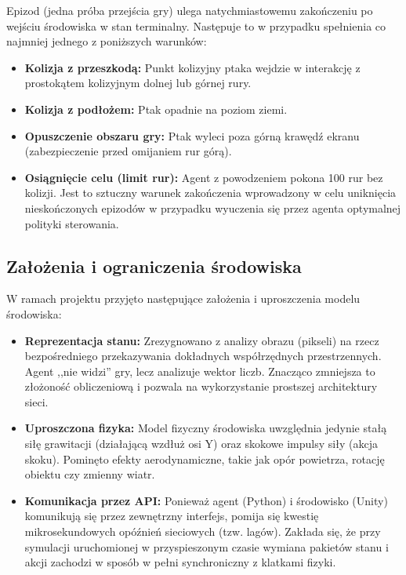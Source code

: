 \documentclass[12pt]{article}
\begin{document}
Epizod (jedna próba przejścia gry) ulega natychmiastowemu zakończeniu po wejściu środowiska w stan terminalny. Następuje to w przypadku spełnienia co najmniej jednego z poniższych warunków:
\begin{itemize}
    \item \textbf{Kolizja z przeszkodą:} Punkt kolizyjny ptaka wejdzie w interakcję z prostokątem kolizyjnym dolnej lub górnej rury.
    \item \textbf{Kolizja z podłożem:} Ptak opadnie na poziom ziemi.
    \item \textbf{Opuszczenie obszaru gry:} Ptak wyleci poza górną krawędź ekranu (zabezpieczenie przed omijaniem rur górą).
    \item \textbf{Osiągnięcie celu (limit rur):} Agent z powodzeniem pokona 100 rur bez kolizji. Jest to sztuczny warunek zakończenia wprowadzony w celu uniknięcia nieskończonych epizodów w przypadku wyuczenia się przez agenta optymalnej polityki sterowania.
\end{itemize}

\subsection{Założenia i ograniczenia środowiska}

W ramach projektu przyjęto następujące założenia i uproszczenia modelu środowiska:
\begin{itemize}
    \item \textbf{Reprezentacja stanu:} Zrezygnowano z analizy obrazu (pikseli) na rzecz bezpośredniego przekazywania dokładnych współrzędnych przestrzennych. Agent ,,nie widzi'' gry, lecz analizuje wektor liczb. Znacząco zmniejsza to złożoność obliczeniową i pozwala na wykorzystanie prostszej architektury sieci.
    \item \textbf{Uproszczona fizyka:} Model fizyczny środowiska uwzględnia jedynie stałą siłę grawitacji (działającą wzdłuż osi Y) oraz skokowe impulsy siły (akcja skoku). Pominęto efekty aerodynamiczne, takie jak opór powietrza, rotację obiektu czy zmienny wiatr.
    \item \textbf{Komunikacja przez API:} Ponieważ agent (Python) i środowisko (Unity) komunikują się przez zewnętrzny interfejs, pomija się kwestię mikrosekundowych opóźnień sieciowych (tzw. lagów). Zakłada się, że przy symulacji uruchomionej w przyspieszonym czasie wymiana pakietów stanu i akcji zachodzi w sposób w pełni synchroniczny z klatkami fizyki.
\end{itemize}
\end{document}
